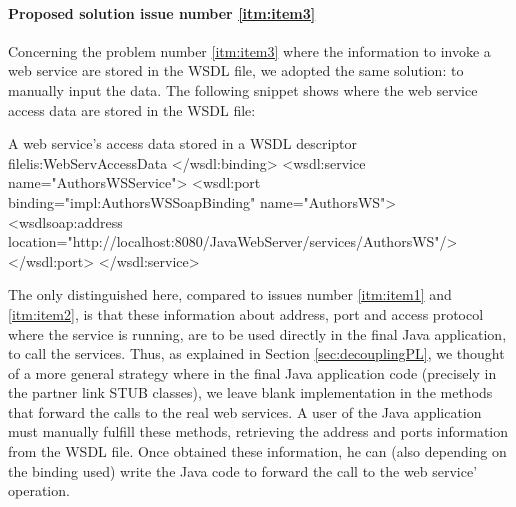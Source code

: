 \paragraph{Proposed solution issue number \ref{itm:item3}}
Concerning the problem number \ref{itm:item3} where the information to invoke a web service are stored in the WSDL file, we adopted the same solution: to manually input the data. The following snippet shows where the web service access data are stored in the WSDL file:
  
\begin{workflow-code}{A web service's access data stored in a WSDL descriptor file}{lis:WebServAccessData}
 </wsdl:binding>
   <wsdl:service name="AuthorsWSService">
      <wsdl:port binding="impl:AuthorsWSSoapBinding" name="AuthorsWS">
         <wsdlsoap:address location="http://localhost:8080/JavaWebServer/services/AuthorsWS"/>
      </wsdl:port>
   </wsdl:service>	
\end{workflow-code}
  
The only distinguished here, compared to issues number \ref{itm:item1} and \ref{itm:item2}, is that these information about address, port and access protocol where the service is running, are to be used directly in the final Java application, to call the services. Thus, as explained in Section \ref{sec:decouplingPL}, we thought of a more general strategy where in the final Java application code (precisely in the partner link STUB classes), we leave blank implementation in the methods that forward the calls to the real web services. A user of the Java application must manually fulfill these methods, retrieving the address and ports information from the WSDL file. Once obtained these information, he can (also depending on the binding used) write the Java code to forward the call to the web service' operation.

  
